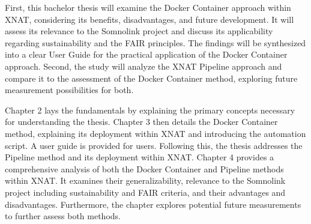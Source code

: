 First, this bachelor thesis will examine the Docker Container approach within XNAT, considering its benefits, disadvantages, and future development. It will assess its relevance to the Somnolink project and discuss its applicability regarding sustainability and the FAIR principles. The findings will be synthesized into a clear User Guide for the practical application of the Docker Container approach.
Second, the study will analyze the XNAT Pipeline approach and compare it to the  assessment of the Docker Container method, exploring future measurement possibilities for both.


Chapter 2 lays the fundamentals by explaining the primary concepts necessary for understanding the thesis. Chapter 3 then details the Docker Container method, explaining its deployment within XNAT and introducing the automation script. A user guide is provided for users. Following this, the thesis addresses the Pipeline method and its deployment within XNAT. Chapter 4 provides a comprehensive analysis of both the Docker Container and Pipeline methods within XNAT. It examines their generalizability, relevance to the Somnolink project including sustainability and FAIR criteria, and their advantages and disadvantages. Furthermore, the chapter explores potential future measurements to further assess both methods.



 

